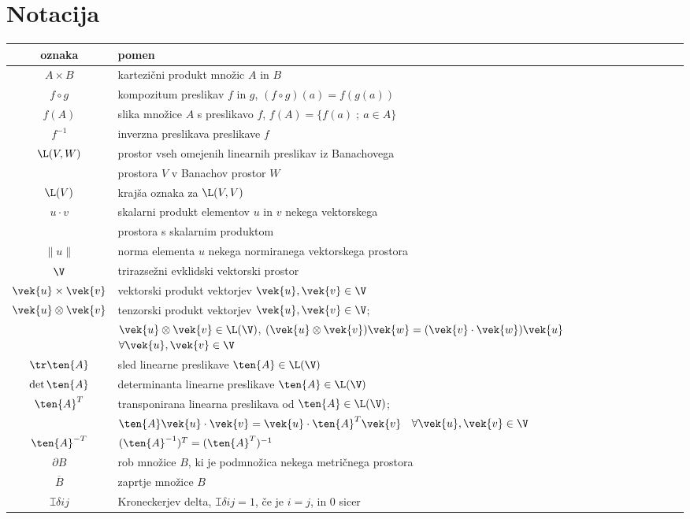 \chapter*{Notacija}


\begin{center}\begin{tabular}[h]{|c|p{11cm}|}
	\hline oznaka & pomen \\ \hline%
	$A\times B$ & kartezični produkt množic $A$ in $B$ \\ %
	$f\circ g$ & kompozitum preslikav $f$ in $g$, $(f\circ g)(a)=f(g(a))$ \\ %
	$f(A)$ & slika množice $A$ s preslikavo $f$, $f(A)=\{f(a)\;;\ a\in A\}$ \\ %
	$f^{-1}$ & inverzna preslikava preslikave $f$ \\ %
	$\L(V,W)$ & prostor vseh omejenih linearnih preslikav iz Banachovega \\ &
	prostora $V$ v Banachov prostor $W$ \\ %
	$\L(V)$ & krajša oznaka za $\L(V,V)$ \\ %
	$u\cdot v$ & skalarni produkt elementov $u$ in $v$ nekega vektorskega \\ &
	prostora s skalarnim produktom \\ %
	$\|u\|$ & norma elementa $u$ nekega normiranega vektorskega prostora \\ %
	$\V$ & trirazsežni evklidski vektorski prostor \\ %
	$\vek{u}\times\vek{v}$ & vektorski produkt vektorjev $\vek{u},\vek{v}\in\V$ \\ %
	$\vek{u}\otimes\vek{v}$ & tenzorski produkt vektorjev $\vek{u},\vek{v}\in\V$; \\
	& $\vek{u}\otimes\vek{v}\in\L(\V)$, $(\vek{u}\otimes\vek{v})\vek{w}=
	(\vek{v}\cdot\vek{w})\vek{u}$ \ $\forall\vek{u},\vek{v}\in\V$ \\ %
	$\tr\ten{A}$ & sled linearne preslikave $\ten{A}\in\L(\V)$ \\ %
	$\det\ten{A}$ & determinanta linearne preslikave $\ten{A}\in\L(\V)$ \\ %
	$\ten{A}^{T}$ & transponirana linearna preslikava od $\ten{A}\in\L(\V)$; \\
	& $\ten{A}\vek{u}\cdot\vek{v}=\vek{u}\cdot\ten{A}^{T}\vek{v}$ \ $\forall\vek{u},\vek{v}\in\V$ \\ %
	$\ten{A}^{-T}$ & $(\ten{A}^{-1})^{T}=(\ten{A}^{T})^{-1}$ \\ %
	$\partial B$ & rob množice $B$, ki je podmnožica nekega metričnega prostora \\ %
	$\overline{B}$ & zaprtje množice $B$ \\ %
	$\topbot{\delta}{i}{j}$ & Kroneckerjev delta, $\topbot{\delta}{i}{j}=1$, če je $i=j$, in 0 sicer \\ \hline
\end{tabular}\end{center}